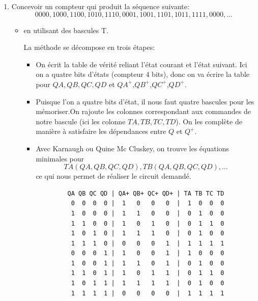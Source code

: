 \documentclass[a4paper,10pt]{exam}
\begin{document}
\begin{enumerate}
\begin{enumerate}
\end{enumerate}


  \item Concevoir un compteur qui produit la séquence suivante:
    $$0000,1000,1100,1010,1110,0001,1001,1101,1011,1111,0000, \dots$$

    \begin{itemize}
      \item en utilisant des bascules T.
        \begin{solution}
          La méthode se décompose en trois étapes:
          \begin{itemize}
            \item On écrit la table de vérité reliant l'état courant et l'état
              suivant. Ici on a quatre bits d'états (compteur 4 bits), donc
              on va écrire la table pour $QA,QB,QC,QD$ et $QA^+$,$QB^+$,$QC^+$,$QD^+$.
            \item Puisque l'on a quatre bits d'état, il nous faut quatre
              bascules pour les mémoriser.On rajoute les colonnes correspondant
              aux commandes de notre bascule (ici les colonne $TA,TB,TC,TD$).
              On les complète de manière à satisfaire les dépendances entre $Q$
              et $Q^+$.
            \item Avec Karnaugh ou Quine Mc Cluskey, on trouve les équations
              minimales pour $$TA(QA,QB,QC,QD),TB(QA,QB,QC,QD), \dots$$ ce qui
              nous permet de réaliser le circuit demandé.
          \end{itemize}

          \begin{verbatim}
            QA QB QC QD | QA+ QB+ QC+ QD+ | TA TB TC TD
             0  0  0  0 |  1   0   0   0  |  1  0  0  0
             1  0  0  0 |  1   1   0   0  |  0  1  0  0
             1  1  0  0 |  1   0   1   0  |  0  1  1  0
             1  0  1  0 |  1   1   1   0  |  0  1  0  0
             1  1  1  0 |  0   0   0   1  |  1  1  1  1
             0  0  0  1 |  1   0   0   1  |  1  0  0  0
             1  0  0  1 |  1   1   0   1  |  0  1  0  0
             1  1  0  1 |  1   0   1   1  |  0  1  1  0
             1  0  1  1 |  1   1   1   1  |  0  1  0  0
             1  1  1  1 |  0   0   0   0  |  1  1  1  1
          \end{verbatim}


\end{solution}
\end{itemize}
\end{enumerate}
\end{document}
